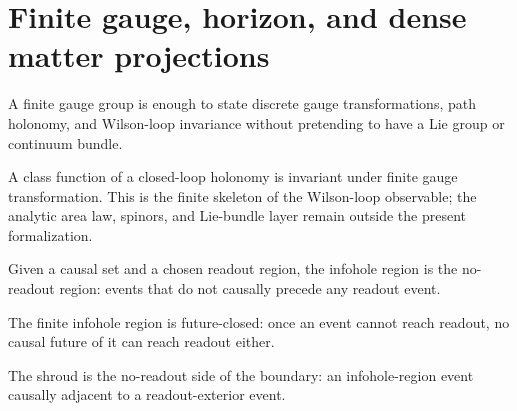 \section{Finite gauge, horizon, and dense matter projections}

\begin{proposition}\label{thm:finite-gauge-group}\leanok{}
A finite gauge group is enough to state discrete gauge transformations, path
holonomy, and Wilson-loop invariance without pretending to have a Lie group or
continuum bundle.
\end{proposition}

\begin{theorem}\label{thm:wilson-loop-invariant}\leanok{}
A class function of a closed-loop holonomy is invariant under finite gauge
transformation.  This is the finite skeleton of the Wilson-loop observable; the
analytic area law, spinors, and Lie-bundle layer remain outside the present
formalization.
\end{theorem}

\begin{proposition}\label{thm:infohole-region}\leanok{}
Given a causal set and a chosen readout region, the infohole region is the
no-readout region: events that do not causally precede any readout event.
\end{proposition}

\begin{theorem}\label{thm:infohole-future-closed}\leanok{}
The finite infohole region is future-closed: once an event cannot reach readout,
no causal future of it can reach readout either.
\end{theorem}

\begin{proposition}\label{thm:infohole-shroud}\leanok{}
The shroud is the no-readout side of the boundary: an infohole-region event
causally adjacent to a readout-exterior event.
\end{proposition}

